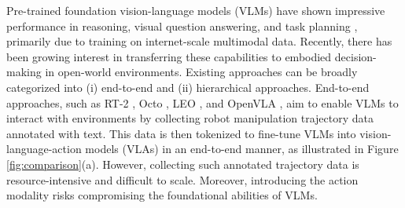 Pre-trained foundation vision-language models (VLMs) \citep{gemini, gpt4} have shown impressive performance in reasoning, visual question answering, and task planning \citep{rt-2,palm-e,deps,agentsurvey}, primarily due to training on internet-scale multimodal data. Recently, there has been growing interest in transferring these capabilities to embodied decision-making in open-world environments. Existing approaches can be broadly categorized into (i) end-to-end and (ii) hierarchical approaches. End-to-end approaches, such as RT-2 \citep{rt-2}, Octo \citep{octo}, LEO \citep{leo}, and OpenVLA \citep{openvlm}, aim to enable VLMs to interact with environments by collecting robot manipulation trajectory data annotated with text. This data is then tokenized to fine-tune VLMs into vision-language-action models (VLAs) in an end-to-end manner, as illustrated in Figure \ref{fig:comparison}(a). However, collecting such annotated trajectory data is resource-intensive and difficult to scale. Moreover, introducing the action modality risks compromising the foundational abilities of VLMs. 


